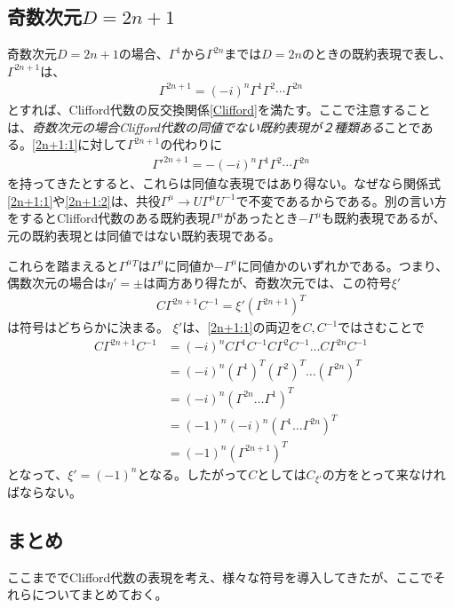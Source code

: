 \documentclass[12pt,a4paper,dvipdfmx]{jlreq}
\begin{document}
\subsection{奇数次元$D=2n+1$}
奇数次元$D=2n+1$の場合、$\Gamma^1$から$\Gamma^{2n}$までは$D=2n$のときの既約表現で表し、$\Gamma^{2n+1}$は、
\begin{align}
  \Gamma^{2n+1}=(-i)^n \Gamma^{1}\Gamma^{2}\cdots \Gamma^{2n}
  \label{2n+1:1}
\end{align}
とすれば、Clifford代数の反交換関係\eqref{Clifford}を満たす。ここで注意することは、\emph{奇数次元の場合Clifford代数の同値でない既約表現が２種類ある}ことである。\eqref{2n+1:1}に対して$\Gamma^{2n+1}$の代わりに
\begin{align}
  \Gamma'^{2n+1}=-(-i)^n \Gamma^{1}\Gamma^{2}\cdots \Gamma^{2n}\label{2n+1:2}
\end{align}
を持ってきたとすると、これらは同値な表現ではあり得ない。なぜなら関係式\eqref{2n+1:1}や\eqref{2n+1:2}は、共役$\Gamma^{\mu}\to U\Gamma^{\mu}U^{-1}$で不変であるからである。別の言い方をするとClifford代数のある既約表現$\Gamma^{\mu}$があったとき$-\Gamma^{\mu}$も既約表現であるが、元の既約表現とは同値ではない既約表現である。

これらを踏まえると$\Gamma^{\mu}{}^{T}$は$\Gamma^{\mu}$に同値か$-\Gamma^{\mu}$に同値かのいずれかである。つまり、偶数次元の場合は$\eta'=\pm$は両方あり得たが、奇数次元では、この符号$\xi'$
\begin{align*}
  C\Gamma^{2n+1}C^{-1}=\xi' (\Gamma^{2n+1})^{T}
\end{align*}
は符号はどちらかに決まる。
$\xi'$は、\eqref{2n+1:1}の両辺を$C,C^{-1}$ではさむことで
\begin{align*}
  C\Gamma^{2n+1}C^{-1}&=(-i)^n
  C\Gamma^{1}C^{-1}C\Gamma^2C^{-1}\dots C\Gamma^{2n}C^{-1}\\
  &=(-i)^n(\Gamma^{1})^T(\Gamma^{2})^T\dots (\Gamma^{2n})^T\\
  &=(-i)^n(\Gamma^{2n}\dots \Gamma^{1})^T\\
  &=(-1)^n (-i)^n(\Gamma^1\dots \Gamma^{2n})^T\\
  &=(-1)^n (\Gamma^{2n+1})^T
\end{align*}
となって、$\xi'=(-1)^n$となる。したがって$C$としては$C_{\xi'}$の方をとって来なければならない。
\subsection{まとめ}
ここまででClifford代数の表現を考え、様々な符号を導入してきたが、ここでそれらについてまとめておく。
\end{document}
